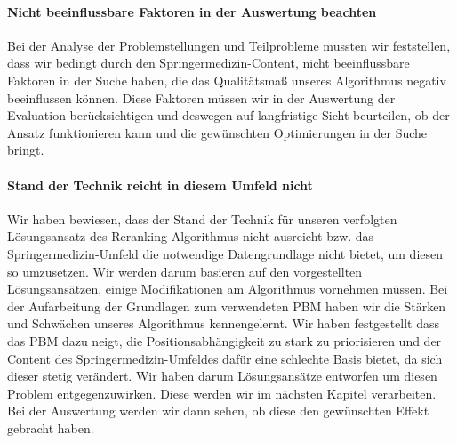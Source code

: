 \paragraph{Nicht beeinflussbare Faktoren in der Auswertung beachten}
Bei der Analyse der Problemstellungen und Teilprobleme mussten wir feststellen, dass wir bedingt durch den Springermedizin-Content, nicht beeinflussbare Faktoren in der Suche haben, die das Qualitätsmaß unseres Algorithmus negativ beeinflussen können. Diese Faktoren müssen wir in der Auswertung der Evaluation berücksichtigen und deswegen auf langfristige Sicht beurteilen, ob der Ansatz funktionieren kann und die gewünschten Optimierungen in der Suche bringt. 

\paragraph{Stand der Technik reicht in diesem Umfeld nicht}
Wir haben bewiesen, dass der Stand der Technik für unseren verfolgten Lösungsansatz des Reranking-Algorithmus nicht ausreicht bzw. das Springermedizin-Umfeld die notwendige Datengrundlage nicht bietet, um diesen so umzusetzen. Wir werden darum basieren auf den vorgestellten Lösungsansätzen, einige Modifikationen am Algorithmus vornehmen müssen. Bei der Aufarbeitung der Grundlagen zum verwendeten PBM haben wir die Stärken und Schwächen unseres Algorithmus kennengelernt. Wir haben festgestellt dass das PBM dazu neigt, die Positionsabhängigkeit zu stark zu priorisieren und der Content des Springermedizin-Umfeldes dafür eine schlechte Basis bietet, da sich dieser stetig verändert. Wir haben darum Lösungsansätze entworfen um diesen Problem entgegenzuwirken. Diese werden wir im nächsten Kapitel verarbeiten. Bei der Auswertung werden wir dann sehen, ob diese den gewünschten Effekt gebracht haben. 
